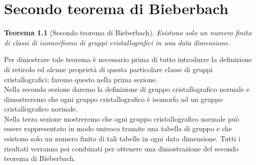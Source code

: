 \documentclass[a4paper,11pt,openright,twoside	]{book}
\newtheorem{theorem}{Teorema}[section]
\begin{document}
\chapter{Secondo teorema di Bieberbach}
\begin{theorem}[Secondo teorema di Bieberbach]
Esistono solo un numero finito di classi di isomorfismo di gruppi cristallografici in una data dimensione. 
\end{theorem}
Per dimostrare tale teorema è necessario prima di tutto introdurre la definizione di reticolo ed alcune proprietà di questa particolare classe di gruppi cristallografici; faremo questo nella prima sezione. \\
Nella seconda sezione daremo la definizione di gruppo cristallografico normale e dimostreremo che ogni gruppo cristallografico è isomorfo ad un gruppo cristallografico normale. \\
Nella terza sezione mostreremo che ogni gruppo cristallografico normale può essere rappresentato in modo univoco tramite una tabella di gruppo e che esistono solo un numero finito di tali tabelle in ogni data dimensione. Tutti i risultati verranno poi combinati per ottenere una dimostrazione del secondo teorema di Bieberbach. 
\end{document}
